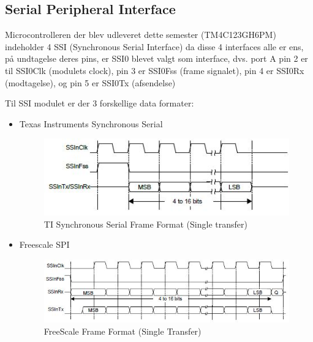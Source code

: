 \subsection{Serial Peripheral Interface}
\label{subsec:SPI}

Microcontrolleren der blev udleveret dette semester (TM4C123GH6PM) indeholder 4 SSI (Synchronous Serial Interface) da disse 4 interfaces alle er ens, på undtagelse deres pins, er SSI0 blevet valgt som interface, dvs. port A pin 2 er til SSI0Clk (modulets clock), pin 3 er SSI0Fss (frame signalet), pin 4 er SSI0Rx (modtagelse), og pin 5 er SSI0Tx (afsendelse)

Til SSI modulet er der 3 forskellige data formater:

\begin{itemize}
	\item Texas Instruments Synchronous Serial
		\begin{figure}[ht]
			\begin{center}
			\includegraphics[scale=1]{Billeder/TI_Synchronous_Serial_Frame_Format.jpg}
			\end{center}
			\caption{TI Synchronous Serial Frame Format (Single transfer)}
			\label{fig:TIFrameFormat}
		\end{figure}

	\item Freescale SPI
		\begin{figure}[ht]
			\begin{center}
			\includegraphics[scale=1]{Billeder/FS_Frame_Format.jpg}
			\end{center}
			\caption{FreeScale Frame Format (Single Transfer)}
			\label{fig:FSFrameFormat}
		\end{figure}
		  

\end{itemize}
